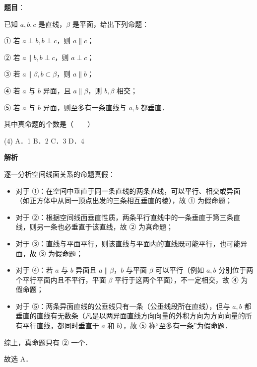 \begin{answer}

\textbf{题目}：

已知 $a, b, c$ 是直线，$\beta$ 是平面，给出下列命题：

① 若 $a \perp b, b \perp c$，则 $a \parallel c$；

② 若 $a \parallel b, b \perp c$，则 $a \perp c$；

③ 若 $a \parallel \beta, b \subset \beta$，则 $a \parallel b$；

④ 若 $a$ 与 $b$ 异面，且 $a \parallel \beta$，则 $b, \beta$ 相交；

⑤ 若 $a$ 与 $b$ 异面，则至多有一条直线与 $a, b$ 都垂直．

其中真命题的个数是\mbox{（　　）}

\begin{gkopts}(4)
\task A．1
\task B．2
\task C．3
\task D．4
\end{gkopts}

\textbf{解析}

逐一分析空间线面关系的命题真假：
\begin{itemize}
\item 对于 ①：在空间中垂直于同一条直线的两条直线，可以平行、相交或异面（如正方体中从同一顶点出发的三条相互垂直的棱），故 ① 为假命题；
\item 对于 ②：根据空间线面垂直性质，两条平行直线中的一条垂直于第三条直线，则另一条也必垂直于该直线，故 ② 为真命题；
\item 对于 ③：直线与平面平行，则该直线与平面内的直线既可能平行，也可能异面，故 ③ 为假命题；
\item 对于 ④：若 $a$ 与 $b$ 异面且 $a \parallel \beta$，$b$ 与平面 $\beta$ 可以平行（例如 $a, b$ 分别位于两个平行平面内且不平行，平面 $\beta$ 平行于这两个平面），不一定相交，故 ④ 为假命题；
\item 对于 ⑤：两条异面直线的公垂线只有一条（公垂线段所在直线），但与 $a, b$ 都垂直的直线有无数条（凡是以两异面直线方向向量的外积方向为方向向量的所有平行直线，都同时垂直于 $a$ 和 $b$），故 ⑤ 称“至多有一条”为假命题．
\end{itemize}

综上，真命题只有 ② 一个．

故选 A．


\end{answer}
